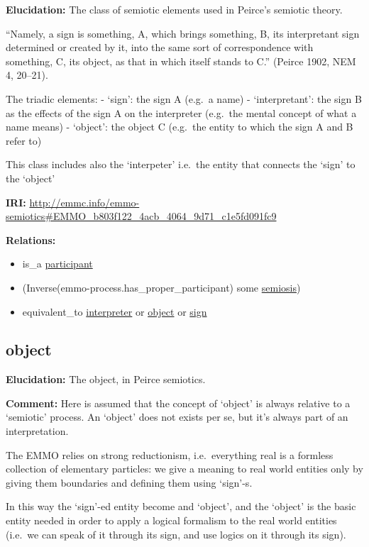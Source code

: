 \documentclass[a4paper,]{report}
\providecommand{\tightlist}{%
  \setlength{\itemsep}{0pt}\setlength{\parskip}{0pt}}
\begin{document}
\textbf{Elucidation:} The class of semiotic elements used in Peirce's
semiotic theory.

``Namely, a sign is something, A, which brings something, B, its
interpretant sign determined or created by it, into the same sort of
correspondence with something, C, its object, as that in which itself
stands to C.'' (Peirce 1902, NEM 4, 20--21).

The triadic elements: - `sign': the sign A (e.g.~a name) -
`interpretant': the sign B as the effects of the sign A on the
interpreter (e.g.~the mental concept of what a name means) - `object':
the object C (e.g.~the entity to which the sign A and B refer to)

This class includes also the `interpeter' i.e.~the entity that connects
the `sign' to the `object'

\textbf{IRI:}
\url{http://emmc.info/emmo-semiotics\#EMMO_b803f122_4acb_4064_9d71_c1e5fd091fc9}

\textbf{Relations:}

\begin{itemize}
\tightlist
\item
  is\_a \protect\hyperlink{participant}{participant}
\item
  (Inverse(emmo-process.has\_proper\_participant) some
  \protect\hyperlink{semiosis}{semiosis})
\item
  equivalent\_to \protect\hyperlink{interpreter}{interpreter} or
  \protect\hyperlink{object}{object} or \protect\hyperlink{sign}{sign}
\end{itemize}

\hypertarget{object}{%
\subsection{object}\label{object}}

\textbf{Elucidation:} The object, in Peirce semiotics.

\textbf{Comment:} Here is assumed that the concept of `object' is always
relative to a `semiotic' process. An `object' does not exists per se,
but it's always part of an interpretation.

The EMMO relies on strong reductionism, i.e.~everything real is a
formless collection of elementary particles: we give a meaning to real
world entities only by giving them boundaries and defining them using
`sign'-s.

In this way the `sign'-ed entity become and `object', and the `object'
is the basic entity needed in order to apply a logical formalism to the
real world entities (i.e.~we can speak of it through its sign, and use
logics on it through its sign).
\end{document}
